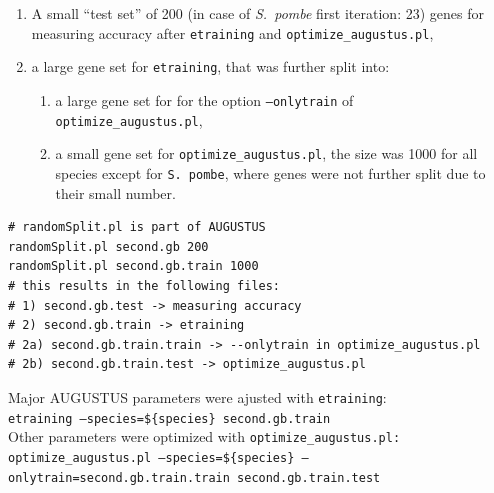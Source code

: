 \documentclass[a4paper,10pt]{report}
\begin{document}
\begin{enumerate}
 \item A small ``test set'' of 200 (in case of \textit{S.~pombe} first iteration: 23) genes for measuring accuracy after \texttt{etraining} and \texttt{optimize\_augustus.pl}, 
 \item a large gene set for \texttt{etraining}, that was further split into:
 \begin{enumerate}
 \item a large gene set for for the option \texttt{--onlytrain} of \\\texttt{optimize\_augustus.pl},
 \item a small gene set for \texttt{optimize\_augustus.pl}, the size was 1000 for all species except for \texttt{S.~pombe}, where genes were not further split due to their small number.
 \end{enumerate}
\end{enumerate}

\begin{verbatim}
# randomSplit.pl is part of AUGUSTUS
randomSplit.pl second.gb 200
randomSplit.pl second.gb.train 1000
# this results in the following files:
# 1) second.gb.test -> measuring accuracy
# 2) second.gb.train -> etraining
# 2a) second.gb.train.train -> --onlytrain in optimize_augustus.pl
# 2b) second.gb.train.test -> optimize_augustus.pl
\end{verbatim}

\noindent Major AUGUSTUS parameters were ajusted with \texttt{etraining}:\\

\noindent \texttt{etraining --species=\$\{species\} second.gb.train}\\



\noindent Other parameters were optimized with \texttt{optimize\_augustus.pl:}\\

\noindent \texttt{optimize\_augustus.pl --species=\$\{species\} --onlytrain=second.gb.train.train second.gb.train.test}\\

\end{document}
